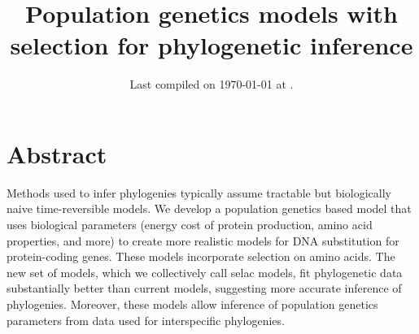\documentclass{article}
\title{Population genetics models with selection for phylogenetic
inference} \date{Last compiled on \today\xspace at \currenttime.}
\begin{document}
\maketitle


\section*{Abstract}
Methods used to infer phylogenies typically assume tractable but biologically naive time-reversible models.
We develop a population genetics based model that uses biological parameters (energy cost of protein production, amino acid properties, and more) to create more realistic models for DNA substitution for protein-coding genes. 
These models incorporate selection on amino acids.
The new set of models, which we collectively call selac models, fit phylogenetic data substantially better than current models, suggesting more accurate inference of phylogenies.
Moreover, these models allow inference of population genetics parameters from data used for interspecific phylogenies.
\end{document}
